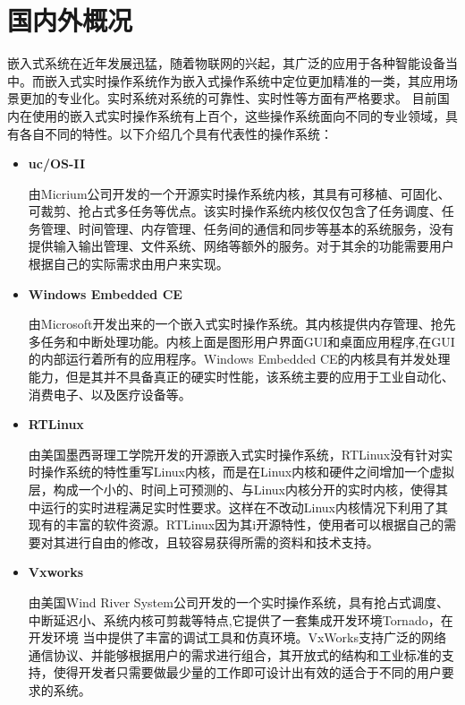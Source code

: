 \section{国内外概况}
	嵌入式系统在近年发展迅猛，随着物联网的兴起，其广泛的应用于各种智能设备当中。而嵌入式实时操作系统作为嵌入式操作系统中定位更加精准的一类，其应用场景更加的专业化\cite{解月江2004VxWorks设备驱动技术研究}\cite{VxWorks嵌入式实时操作系统的结构研究}。实时系统对系统的可靠性、实时性等方面有严格要求。
	目前国内在使用的嵌入式实时操作系统有上百个，这些操作系统面向不同的专业领域，具有各自不同的特性。以下介绍几个具有代表性的操作系统：
\begin{itemize}
\item \textbf{uc/OS-II}
	
	由Micrium公司开发的一个开源实时操作系统内核，其具有可移植、可固化、可裁剪、抢占式多任务等优点\cite{Wu2008Implementation}\cite{}。该实时操作系统内核仅仅包含了任务调度、任务管理、时间管理、内存管理、任务间的通信和同步等基本的系统服务，没有提供输入输出管理、文件系统、网络等额外的服务\cite{马增炜2011基于}\cite{Zhang2010Design}。对于其余的功能需要用户根据自己的实际需求由用户来实现。
	
\item \textbf{Windows Embedded CE}

	由Microsoft开发出来的一个嵌入式实时操作系统。其内核提供内存管理、抢先多任务和中断处理功能。内核上面是图形用户界面GUI和桌面应用程序,在GUI的内部运行着所有的应用程序\cite{徐媛媛2003嵌入式实时操作系统的设备驱动}\cite{谢强2007基于}。Windows Embedded CE的内核具有并发处理能力，但是其并不具备真正的硬实时性能，该系统主要的应用于工业自动化、消费电子、以及医疗设备等。
	
\item \textbf{RTLinux}
	
	由美国墨西哥理工学院开发的开源嵌入式实时操作系统，RTLinux没有针对实时操作系统的特性重写Linux内核，而是在Linux内核和硬件之间增加一个虚拟层，构成一个小的、时间上可预测的、与Linux内核分开的实时内核，使得其中运行的实时进程满足实时性要求\cite{郭春生2002硬实时操作系统}。这样在不改动Linux内核情况下利用了其现有的丰富的软件资源\cite{Zhu2004RTLinux}。RTLinux因为其i开源特性，使用者可以根据自己的需要对其进行自由的修改，且较容易获得所需的资料和技术支持。
	
\item \textbf{Vxworks}

	由美国Wind River System公司开发的一个实时操作系统，具有抢占式调度、中断延迟小、系统内核可剪裁等特点\cite{李立志2003实时操作系统}\cite{陈洋2007VxWorks},它提供了一套集成开发环境Tornado，在开发环境 当中提供了丰富的调试工具和仿真环境。VxWorks支持广泛的网络通信协议、并能够根据用户的需求进行组合，其开放式的结构和工业标准的支持，使得开发者只需要做最少量的工作即可设计出有效的适合于不同的用户要求的系统\cite{谢强2007基于}\cite{徐媛媛2003嵌入式实时操作系统的设备驱动}。	
\end{itemize}	
		


